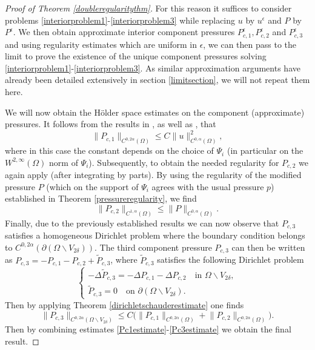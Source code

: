 \documentclass[12pt,a4paper]{article}
\theoremstyle{definition}
\theoremstyle{remark}
\numberwithin{equation}{section}
\begin{document}
\begin{proof}[Proof of Theorem \ref{doubleregularitythm}]
For this reason it suffices to consider problems \eqref{interiorproblem1}-\eqref{interiorproblem3} while replacing $u$ by $u^\epsilon$ and $P$ by $P^\epsilon$. We then obtain approximate interior component pressures $P_{c,1}^\epsilon, P_{c,2}^\epsilon$ and $P_{c,3}^\epsilon$ and using regularity estimates which are uniform in $\epsilon$, we can then pass to the limit to prove the existence of the unique component pressures solving \eqref{interiorproblem1}-\eqref{interiorproblem3}. As similar approximation arguments have already been detailed extensively in section \ref{limitsection}, we will not repeat them here.

We will now obtain the Hölder space estimates on the component (approximate) pressures. It follows from the results in \cite{silvestre}, as well as \cite[~Theorem 13.1.1]{jostPDE}, that
\begin{equation} \label{Pc1estimate}
\lVert P_{c,1} \rVert_{C^{0,2 \alpha} (\Omega)} \leq C \lVert u \rVert_{C^{0,\alpha} (\Omega)}^2,
\end{equation}
where in this case the constant depends on the choice of $\Psi_i$ (in particular on the $W^{2,\infty} (\Omega)$ norm of $\Psi_i$). Subsequently, to obtain the needed regularity for $P_{c,2}$ we again apply \cite[~Theorem 13.1.1]{jostPDE} (after integrating by parts). By using the regularity of the modified pressure $P$ (which on the support of $\Psi_i$ agrees with the usual pressure $p$) established in Theorem \ref{pressureregularity}, we find
\begin{equation} \label{Pc2estimate}
\lVert P_{c,2} \rVert_{C^{1,\alpha} (\Omega)} \leq \lVert P \rVert_{C^{0,\alpha} (\Omega)}.
\end{equation}
Finally, due to the previously established results we can now observe that $P_{c,3}$ satisfies a homogeneous Dirichlet problem where the boundary condition belongs to $C^{0,2 \alpha} (\partial (\Omega \backslash V_{2 \delta}))$. The third component pressure $P_{c,3}$ can then be written as $P_{c,3} = - P_{c,1} - P_{c,2} + \widetilde{P}_{c,3}$, where $\widetilde{P}_{c,3}$ satisfies the following Dirichlet problem
\begin{equation*}
\begin{cases}
-\Delta \widetilde{P}_{c,3} = -\Delta P_{c,1} -\Delta P_{c,2} \quad \text{in } \Omega \backslash V_{2 \delta}, \\
\widetilde{P}_{c,3} = 0 \quad \text{on } \partial (\Omega \backslash V_{2 \delta}).
\end{cases}
\end{equation*}
Then by applying Theorem \ref{dirichletschauderestimate} one finds
\begin{equation} \label{Pc3estimate}
\lVert P_{c,3} \rVert_{C^{0,2\alpha} (\Omega \backslash V_{2 \delta})} \leq C \big(\lVert P_{c,1} \rVert_{C^{0,2\alpha} (\Omega)} + \lVert P_{c,2} \rVert_{C^{0,2\alpha} (\Omega)} \big).
\end{equation}
Then by combining estimates \eqref{Pc1estimate}-\eqref{Pc3estimate} we obtain the final result.
\end{proof}
\end{document}
